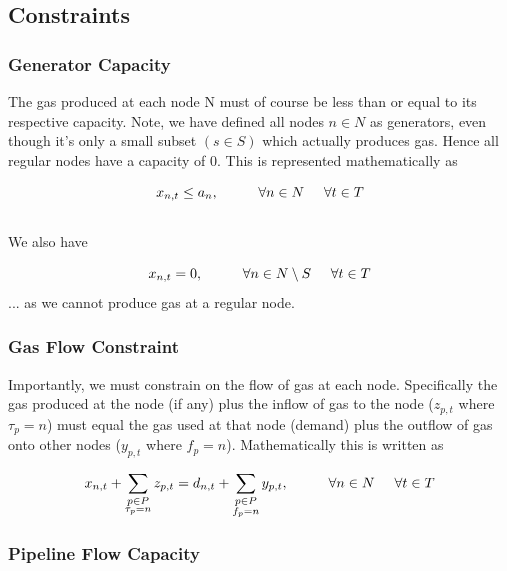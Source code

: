 \documentclass{article}
\begin{document}
\bigskip
\subsection{Constraints}
\bigskip
\subsubsection{Generator Capacity}
The gas produced at each node N must of course be less than or equal to its respective capacity. Note, we have defined all nodes \(n \in N\) as generators, even though it's only a small subset \((s \in S)\) which actually produces gas. Hence all regular nodes have a capacity of \(0\). This is represented mathematically as

\[x_{n,t}\leq a_n, \hspace{1cm} \forall n\in N \hspace{0.5cm} \forall t \in T\]
\\
We also have

\[x_{n,t} = 0, \hspace{1cm} \forall n\in N \setminus S \hspace{0.5cm} \forall t \in T\]
... as we cannot produce gas at a regular node.

\bigskip


\subsubsection{Gas Flow Constraint}

Importantly, we must constrain on the flow of gas at each node. Specifically the gas produced at the node (if any) plus the inflow of gas to the node (\(z_{p,t}\) where \(\tau_p=n\)) must equal the gas used at that node (demand) plus the outflow of gas onto other nodes (\(y_{p,t}\) where \(f_p=n\)). Mathematically this is written as

\[x_{n,t}+\sum_{\substack{p\in P \\ \tau_p = n}}z_{p,t} = d_{n,t} + \sum_{\substack{p\in P \\ f_p = n}}y_{p,t}, \hspace{1cm} \forall n \in N \hspace{0.5cm} \forall t \in T\]

\subsubsection{Pipeline Flow Capacity}
\end{document}
